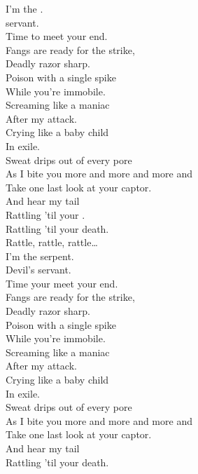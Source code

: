 I'm the . \\
 servant. \\
Time to meet your end. \\

Fangs are ready for the strike, \\
Deadly razor sharp. \\
Poison with a single spike \\
While you're immobile. \\

Screaming like a maniac \\
After my attack. \\
Crying like a baby child \\
In exile. \\

Sweat drips out of every pore \\
As I bite you more and more and more and \\
Take one last look at your captor. \\
And hear my tail \\
Rattling 'til your . \\
Rattling 'til your death. \\

Rattle, rattle, rattle… \\

I'm the serpent. \\
Devil's servant. \\
Time your meet your end. \\

Fangs are ready for the strike, \\
Deadly razor sharp. \\
Poison with a single spike \\
While you're immobile. \\

Screaming like a maniac \\
After my attack. \\
Crying like a baby child \\
In exile. \\

Sweat drips out of every pore \\
As I bite you more and more and more and \\
Take one last look at your captor. \\
And hear my tail \\
Rattling 'til your death. \\ \\

